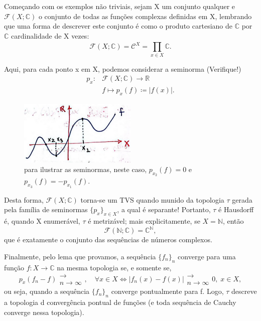 \documentclass[../distribution_theory_notes.tex]{subfiles}
\begin{document}
   \begin{example}
     Começando com os exemplos não triviais, sejam X um conjunto qualquer e \(\mathcal{F}(X; \mathbb{C})\) o conjunto de todas as funções complexas definidas em X, lembrando que uma forma de descrever este conjunto é como o produto cartesiano de \(\mathbb{C}\) por \(\mathbb{C}\) cardinalidade de X vezes: 
       \[
         \mathcal{F}(X; \mathbb{C})=\mathcal{C}^{X}=\prod\limits_{x\in X}^{}\mathbb{C}.
       \]

       Aqui, para cada ponto x em X, podemos considerar a seminorma (Verifique!) 
      \begin{align*}
        p_{x}:&\mathcal{F}(X; \mathbb{C})\rightarrow \mathbb{R}\\ 
              &f \mapsto p_{x}(f)\coloneqq |f(x)|.
      \end{align*}
     \begin{figure}[H]
     \begin{center}
     \includegraphics[height=0.5\textheight, width=0.5\textwidth, keepaspectratio]{./Images/complex_seminorms_03.png}
     \end{center}
     \caption{para ilustrar as seminormas, neste caso, \(p_{x_2}(f)=0\) e \(p_{x_{3}}(f)=-p_{x_{1}}(f).\)}
     \end{figure}

      Desta forma, \(\mathcal{F}(X; \mathbb{C})\) torna-se um TVS quando munido da topologia \(\tau \) gerada pela família de seminormas \(\{p_{x}\}_{x\in X}\), a qual é separante! Portanto, \(\tau \) é Hausdorff é, quando X enumerável, \(\tau \) é metrizável; mais explicitamente, se \(X=\mathbb{N}\), então 
        \[
          \mathcal{F}(\mathbb{N}; \mathbb{C}) = \mathbb{C}^{\mathbb{N}},
        \]
        que é exatamente o conjunto das sequências de números complexos.

        Finalmente, pelo lema que provamos, a sequência \(\{f_{n}\}_{n}\) converge para uma função \(f:X\rightarrow \mathbb{C}\) na mesma topologia se, e somente se, 
          \[
            p_{x}(f_{n}-f)\substack{\rightarrow  \\ n\to \infty}, \quad \forall x\in X \Longleftrightarrow |f_{n}(x)-f(x)|\substack{\rightarrow  \\ n\to\infty} 0,\; x\in X,
          \]
          ou seja, quando a sequência \(\{f_{n}\}_{n}\) converge pontualmente para f. Logo, \(\tau \) descreve a topologia d convergência pontual de funções (e toda sequência de Cauchy converge nessa topologia).
   \end{example}
\end{document}
